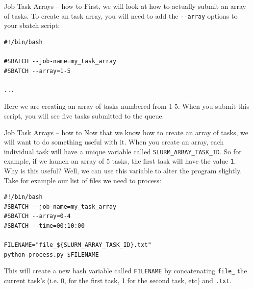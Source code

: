 \documentclass[10pt]{beamer}
\begin{document}
\begin{frame}[label={sec:orgdf255e3},fragile]{Job Task Arrays -- how to}
 First, we will look at how to actually submit an array of tasks. To create an
task array, you will need to add the \texttt{-{}-array} options to your sbatch script:

\begin{verbatim}
#!/bin/bash

#SBATCH --job-name=my_task_array
#SBATCH --array=1-5

...
\end{verbatim}

Here we are creating an array of tasks numbered from 1-5. When you submit this
script, you will see five tasks submitted to the queue.
\end{frame}

\begin{frame}[label={sec:org0607ff7},fragile]{Job Task Arrays -- how to}
 Now that we know how to create an array of tasks, we will want to do something
useful with it. When you create an array, each individual task will have a
unique variable called \texttt{SLURM\_ARRAY\_TASK\_ID}. So for example, if we launch an
array of 5 tasks, the first task will have the value \texttt{1}. Why is this useful?
Well, we can use this variable to alter the program slightly. Take for example
our list of files we need to process:

\begin{verbatim}
#!/bin/bash
#SBATCH --job-name=my_task_array
#SBATCH --array=0-4
#SBATCH --time=00:10:00

FILENAME="file_${SLURM_ARRAY_TASK_ID}.txt"
python process.py $FILENAME
\end{verbatim}

This will create a new bash variable called \texttt{FILENAME} by concatenating \texttt{file\_} the
current task's (i.e. 0, for the first task, 1 for the second task, etc) and
\texttt{.txt}.
\end{frame}
\end{document}
